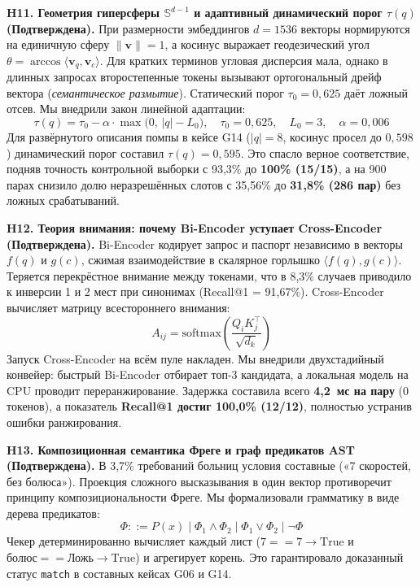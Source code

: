 \documentclass[10pt,a4paper]{article}
\begin{document}
\textbf{H11. Геометрия гиперсферы $\mathbb{S}^{d-1}$ и адаптивный динамический порог $\tau(q)$ (Подтверждена).}
При размерности эмбеддингов $d=1536$ векторы нормируются на единичную сферу $\|\mathbf{v}\|=1$, а косинус выражает геодезический угол $\theta = \arccos\langle \mathbf{v}_q, \mathbf{v}_c \rangle$. Для кратких терминов угловая дисперсия мала, однако в длинных запросах второстепенные токены вызывают ортогональный дрейф вектора (\emph{семантическое размытие}). Статический порог $\tau_0 = 0{,}625$ даёт ложный отсев. Мы внедрили закон линейной адаптации:
\begin{equation*}
  \tau(q) = \tau_0 - \alpha \cdot \max\bigl(0,\, |q| - L_0\bigr), \quad \tau_0 = 0{,}625, \quad L_0 = 3, \quad \alpha = 0{,}006
\end{equation*}
Для развёрнутого описания помпы в кейсе G14 ($|q|=8$, косинус просел до $0{,}598$) динамический порог составил $\tau(q) = 0{,}595$. Это спасло верное соответствие, подняв точность контрольной выборки с 93,3\% до \textbf{100\% (15/15)}, а на 900 парах снизило долю неразрешённых слотов с 35,56\% до \textbf{31,8\% (286 пар)} без ложных срабатываний.

\textbf{H12. Теория внимания: почему Bi-Encoder уступает Cross-Encoder (Подтверждена).}
Bi-Encoder кодирует запрос и паспорт независимо в векторы $f(q)$ и $g(c)$, сжимая взаимодействие в скалярное горлышко $\langle f(q), g(c) \rangle$. Теряется перекрёстное внимание между токенами, что в 8,3\% случаев приводило к инверсии 1 и 2 мест при синонимах (Recall@1 = 91,67\%). Cross-Encoder вычисляет матрицу всестороннего внимания:
\begin{equation*}
  A_{ij} = \mathrm{softmax}\left(\frac{Q_i K_j^\top}{\sqrt{d_k}}\right)
\end{equation*}
Запуск Cross-Encoder на всём пуле накладен. Мы внедрили двухстадийный конвейер: быстрый Bi-Encoder отбирает топ-3 кандидата, а локальная модель на CPU проводит переранжирование. Задержка составила всего \textbf{4,2~мс на пару} (0 токенов), а показатель \textbf{Recall@1 достиг 100,0\% (12/12)}, полностью устранив ошибки ранжирования.

\textbf{H13. Композиционная семантика Фреге и граф предикатов AST (Подтверждена).}
В 3,7\% требований больниц условия составные («7 скоростей, без болюса»). Проекция сложного высказывания в один вектор противоречит принципу композициональности Фреге. Мы формализовали грамматику в виде дерева предикатов:
\begin{equation*}
  \Phi ::= P(x) \;\big|\; \Phi_1 \wedge \Phi_2 \;\big|\; \Phi_1 \vee \Phi_2 \;\big|\; \neg \Phi
\end{equation*}
Чекер детерминированно вычисляет каждый лист ($7 == 7 \to \text{True}$ и $\text{болюс} == \text{Ложь} \to \text{True}$) и агрегирует корень. Это гарантировало доказанный статус \texttt{match} в составных кейсах G06 и G14.
\end{document}
